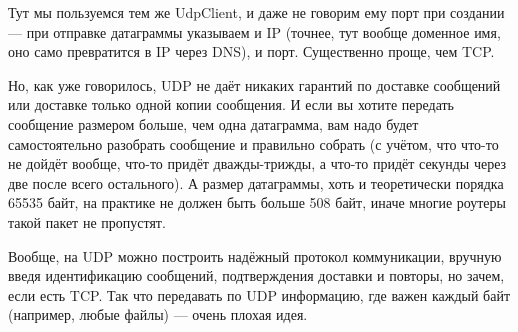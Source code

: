 \documentclass{../../text-style}
\begin{document}
Тут мы пользуемся тем же UdpClient, и даже не говорим ему порт при создании --- при отправке датаграммы указываем и IP (точнее, тут вообще доменное имя, оно само превратится в IP через DNS), и порт. Существенно проще, чем TCP.

Но, как уже говорилось, UDP не даёт никаких гарантий по доставке сообщений или доставке только одной копии сообщения. И если вы хотите передать сообщение размером больше, чем одна датаграмма, вам надо будет самостоятельно разобрать сообщение и правильно собрать (с учётом, что что-то не дойдёт вообще, что-то придёт дважды-трижды, а что-то придёт секунды через две после всего остального). А размер датаграммы, хоть и теоретически порядка 65535 байт, на практике не должен быть больше 508 байт, иначе многие роутеры такой пакет не пропустят. 

Вообще, на UDP можно построить надёжный протокол коммуникации, вручную введя идентификацию сообщений, подтверждения доставки и повторы, но зачем, если есть TCP. Так что передавать по UDP информацию, где важен каждый байт (например, любые файлы) --- очень плохая идея.
\end{document}
